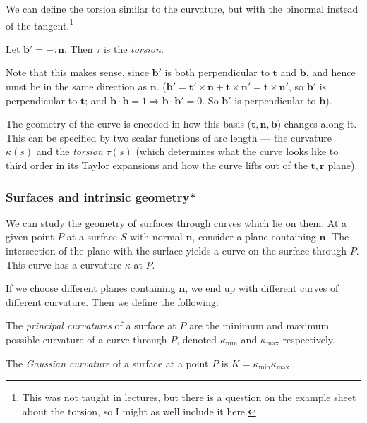 \documentclass[a4paper]{article}
\begin{document}
We can define the torsion similar to the curvature, but with the binormal instead of the tangent.\footnote{This was not taught in lectures, but there is a question on the example sheet about the torsion, so I might as well include it here.}

\begin{defi}[Torsion]  Let $\mathbf{b}' = -\tau \mathbf{n}$. Then $\tau$ is the \emph{torsion}.
\end{defi}
Note that this makes sense, since $\mathbf{b}'$ is both perpendicular to $\mathbf{t}$ and $\mathbf{b}$, and hence must be in the same direction as $\mathbf{n}$. ($\mathbf{b}' = \mathbf{t}'\times \mathbf{n} + \mathbf{t}\times \mathbf{n}' = \mathbf{t}\times \mathbf{n}'$, so $\mathbf{b}'$ is perpendicular to $\mathbf{t}$; and $\mathbf{b} \cdot \mathbf{b} = 1\Rightarrow \mathbf{b}\cdot \mathbf{b}' = 0$. So $\mathbf{b}'$ is perpendicular to $\mathbf{b}$).

The geometry of the curve is encoded in how this basis ($\mathbf{t}, \mathbf{n}, \mathbf{b}$) changes along it. This can be specified by two scalar functions of arc length --- the curvature $\kappa(s)$ and the \emph{torsion} $\tau(s)$ (which determines what the curve looks like to third order in its Taylor expansions and how the curve lifts out of the $\mathbf{t}, \mathbf{r}$ plane).

\subsubsection*{Surfaces and intrinsic geometry*}
We can study the geometry of surfaces through curves which lie on them. At a given point $P$ at a surface $S$ with normal $\mathbf{n}$, consider a plane containing $\mathbf{n}$. The intersection of the plane with the surface yields a curve on the surface through $P$. This curve has a curvature $\kappa$ at $P$.

If we choose different planes containing $\mathbf{n}$, we end up with different curves of different curvature. Then we define the following:
\begin{defi}
  The \emph{principal curvatures} of a surface at $P$ are the minimum and maximum possible curvature of a curve through $P$, denoted $\kappa_{\min}$ and $\kappa_{\max}$ respectively.
\end{defi}

\begin{defi}
  The \emph{Gaussian curvature} of a surface at a point $P$ is $K = \kappa_{\min}\kappa_{\max}$.
\end{defi}
\end{document}
